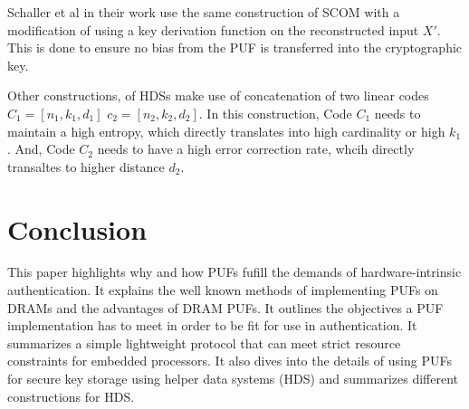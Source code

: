 \documentclass[journal, a4paper]{IEEEtran}
\begin{document}
Schaller et al in their work use the same construction of SCOM with a modification of using a key derivation function on the reconstructed input \(X'\). This is done to ensure no bias from the PUF is transferred into the cryptographic key.

Other constructions, of HDSs make use of concatenation of two linear codes \(C_{1} = [n_{1}, k_{1}, d_{1}]\) \( c_{2} = [n_{2}, k_{2}, d_{2}]\).\cite{HDS15} In this construction, Code \(C_{1}\) needs to maintain a high entropy, which directly translates into high cardinality or high \(k_{1}\). And, Code \(C_{2}\) needs to have a high error correction rate, whcih directly transaltes to higher distance \(d_{2}\).

\section{Conclusion}
This paper highlights why and how PUFs fufill the demands of hardware-intrinsic authentication. It explains the well known methods of implementing PUFs on DRAMs and the advantages of DRAM PUFs. It outlines the objectives a PUF implementation has to meet in order to be fit for use in authentication. It summarizes a simple lightweight protocol that can meet strict resource constraints for embedded processors. It also dives into the details of using PUFs for secure key storage using helper data systems (HDS) and summarizes different constructions for HDS.
\end{document}

